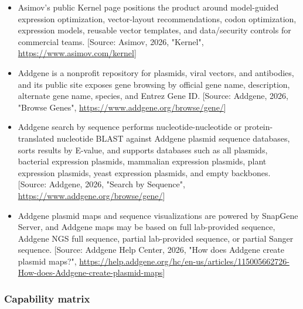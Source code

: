 \documentclass[11pt]{report}
\begin{document}
\begin{itemize}
\item Asimov's public Kernel page positions the product around model-guided expression optimization, vector-layout recommendations, codon optimization, expression models, reusable vector templates, and data/security controls for commercial teams. [Source: Asimov, 2026, "Kernel", \url{https://www.asimov.com/kernel}]
\item Addgene is a nonprofit repository for plasmids, viral vectors, and antibodies, and its public site exposes gene browsing by official gene name, description, alternate gene name, species, and Entrez Gene ID. [Source: Addgene, 2026, "Browse Genes", \url{https://www.addgene.org/browse/gene/}]
\item Addgene search by sequence performs nucleotide-nucleotide or protein-translated nucleotide BLAST against Addgene plasmid sequence databases, sorts results by E-value, and supports databases such as all plasmids, bacterial expression plasmids, mammalian expression plasmids, plant expression plasmids, yeast expression plasmids, and empty backbones. [Source: Addgene, 2026, "Search by Sequence", \url{https://www.addgene.org/browse/gene/}]
\item Addgene plasmid maps and sequence visualizations are powered by SnapGene Server, and Addgene maps may be based on full lab-provided sequence, Addgene NGS full sequence, partial lab-provided sequence, or partial Sanger sequence. [Source: Addgene Help Center, 2026, "How does Addgene create plasmid maps?", \url{https://help.addgene.org/hc/en-us/articles/115005662726-How-does-Addgene-create-plasmid-maps}]
\end{itemize}

\subsubsection{Capability matrix}
\end{document}
